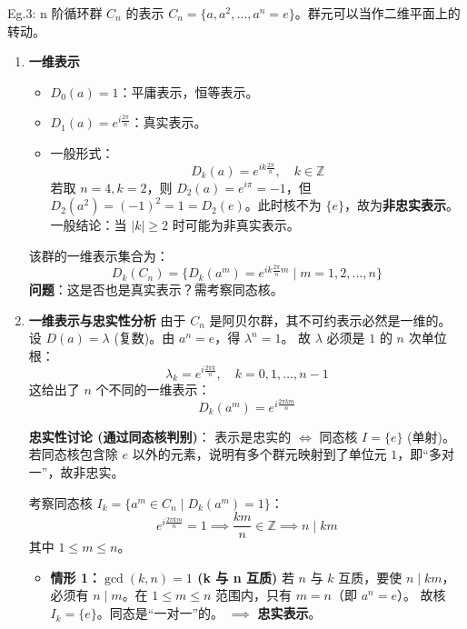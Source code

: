 \begin{example}{Eg.3: n 阶循环群 $C_n$ 的表示}
    $C_n = \{a, a^2, \dots, a^n=e\}$。群元可以当作二维平面上的转动。

    \begin{enumerate}
        \item \textbf{一维表示}
    \begin{itemize}
        \item $D_0(a) = 1$：平庸表示，恒等表示。
        \item $D_1(a) = e^{i\frac{2\pi}{n}}$：真实表示。
        \item 一般形式：
        \begin{equation}
            D_k(a) = e^{ik\frac{2\pi}{n}}, \quad k \in \mathbb{Z}
        \end{equation}
        若取 $n=4, k=2$，则 $D_2(a) = e^{i\pi} = -1$，但 $D_2(a^2) = (-1)^2 = 1 = D_2(e)$。此时核不为 $\{e\}$，故为\textbf{非忠实表示}。
        一般结论：当 $|k| \ge 2$ 时可能为非真实表示。
    \end{itemize}
    该群的一维表示集合为：
    \begin{equation}
        D_k(C_n) = \{ D_k(a^m) = e^{ik\frac{2\pi}{n}m} \mid m=1, 2, \dots, n \}
    \end{equation}
    \textbf{问题}：这是否也是真实表示？需考察同态核。

        \item \textbf{一维表示与忠实性分析}
    由于 $C_n$ 是阿贝尔群，其不可约表示必然是一维的。
    设 $D(a) = \lambda$ (复数)。由 $a^n = e$，得 $\lambda^n = 1$。
    故 $\lambda$ 必须是 $1$ 的 $n$ 次单位根：
    \begin{equation}
        \lambda_k = e^{i \frac{2\pi k}{n}}, \quad k = 0, 1, \dots, n-1
    \end{equation}
    这给出了 $n$ 个不同的一维表示：
    \begin{equation}
        D_k(a^m) = e^{i \frac{2\pi k m}{n}}
    \end{equation}
    
    \textbf{忠实性讨论 (通过同态核判别)}：
    表示是忠实的 $\iff$ 同态核 $I = \{e\}$ (单射)。
    若同态核包含除 $e$ 以外的元素，说明有多个群元映射到了单位元 $1$，即“多对一”，故非忠实。
    
    考察同态核 $I_k = \{ a^m \in C_n \mid D_k(a^m) = 1 \}$：
    \begin{equation}
        e^{i \frac{2\pi k m}{n}} = 1 \implies \frac{km}{n} \in \mathbb{Z} \implies n \mid km
    \end{equation}
    其中 $1 \le m \le n$。
    \begin{itemize}
        \item \textbf{情形 1：$\gcd(k, n) = 1$ (k 与 n 互质)}
        若 $n$ 与 $k$ 互质，要使 $n \mid km$，必须有 $n \mid m$。在 $1 \le m \le n$ 范围内，只有 $m=n$（即 $a^n=e$）。
        故核 $I_k = \{e\}$。同态是“一对一”的。
        $\implies$ \textbf{忠实表示}。
        

\end{itemize}
\end{enumerate}
\end{example}
